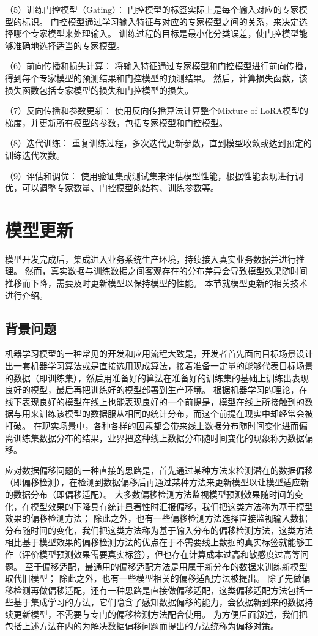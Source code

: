 （5）训练门控模型（Gating）：
门控模型的标签实际上是每个输入对应的专家模型的标识。
门控模型通过学习输入特征与对应的专家模型之间的关系，来决定选择哪个专家模型来处理输入。
训练过程的目标是最小化分类误差，使门控模型能够准确地选择适当的专家模型。

（6）前向传播和损失计算：
将输入特征通过专家模型和门控模型进行前向传播，得到每个专家模型的预测结果和门控模型的预测结果。
然后，计算损失函数，该损失函数包括专家模型的损失和门控模型的损失。

（7）反向传播和参数更新：
使用反向传播算法计算整个Mixture of LoRA模型的梯度，并更新所有模型的参数，包括专家模型和门控模型。

（8）迭代训练：
重复训练过程，多次迭代更新参数，直到模型收敛或达到预定的训练迭代次数。

（9）评估和调优：
使用验证集或测试集来评估模型性能，根据性能表现进行调优，可以调整专家数量、门控模型的结构、训练参数等。


\section{模型更新}

模型开发完成后，集成进入业务系统生产环境，持续接入真实业务数据并进行推理。
然而，真实数据与训练数据之间客观存在的分布差异会导致模型效果随时间推移而下降，需要及时更新模型以保持模型的性能。
本节就模型更新的相关技术进行介绍。

\subsection{背景问题}

机器学习模型的一种常见的开发和应用流程大致是，开发者首先面向目标场景设计出一套机器学习算法或是直接选用现成算法，接着准备一定量的能够代表目标场景的数据（即训练集），然后用准备好的算法在准备好的训练集的基础上训练出表现良好的模型，最后再把训练好的模型部署到生产环境。
根据机器学习的理论，在线下表现良好的模型在线上也能表现良好的一个前提是，模型在线上所接触到的数据与用来训练该模型的数据服从相同的统计分布，而这个前提在现实中却经常会被打破。
在现实场景中，各种各样的因素都会带来线上数据分布随时间变化进而偏离训练集数据分布的结果，业界把这种线上数据分布随时间变化的现象称为数据偏移。

应对数据偏移问题的一种直接的思路是，首先通过某种方法来检测潜在的数据偏移（即偏移检测），在检测到数据偏移后再通过某种方法来更新模型以让模型适应新的数据分布（即偏移适配）。
大多数偏移检测方法监视模型预测效果随时间的变化，在模型效果的下降具有统计显著性时汇报偏移，我们把这类方法称为基于模型效果的偏移检测方法；
除此之外，也有一些偏移检测方法选择直接监视输入数据分布随时间的变化，我们把这类方法称为基于输入分布的偏移检测方法，这类方法相比基于模型效果的偏移检测方法的优点在于不需要线上数据的真实标签就能够工作（评价模型预测效果需要真实标签），但也存在计算成本过高和敏感度过高等问题。
至于偏移适配，最通用的偏移适配方法是用属于新分布的数据来训练新模型取代旧模型；
除此之外，也有一些模型相关的偏移适配方法被提出。
除了先做偏移检测再做偏移适配，还有一种思路是直接做偏移适配，这类偏移适配方法包括一些基于集成学习的方法，它们隐含了感知数据偏移的能力，会依据新到来的数据持续更新模型，不需要与专门的偏移检测方法配合使用。
为方便后面叙述，我们把包括上述方法在内的为解决数据偏移问题而提出的方法统称为偏移对策。

